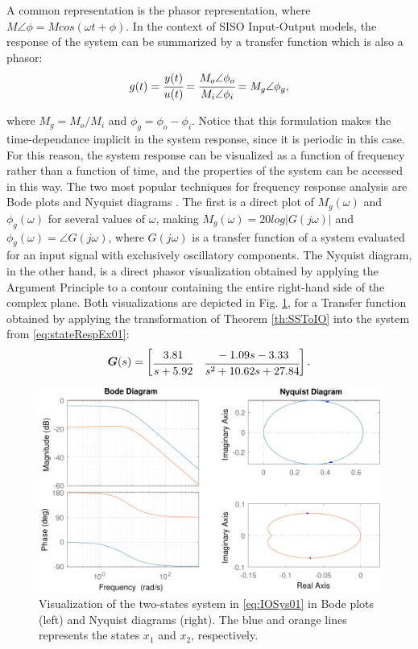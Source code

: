 \documentclass[a4paper,11pt]{book}
\numberwithin{figure}{chapter}
\numberwithin{equation}{chapter}
\numberwithin{table}{chapter}
\theoremstyle{definition}
\begin{document}
A common representation is the phasor representation, where $M \angle \phi = M cos(\omega t + \phi)$. In the context of SISO Input-Output models, the response of the system can be summarized by a transfer function which is also a phasor:
\begin{equation}
    g(t) = \cfrac{y(t)}{u(t)} = \cfrac{M_o \angle \phi_o}{M_i \angle \phi_i} = M_g \angle \phi_g
,\end{equation}

\noindent where $M_g = M_o / M_i$ and $\phi_g = \phi_o - \phi_i$. Notice that this formulation makes the time-dependance implicit in the system response, since it is periodic in this case. For this reason, the system response can be visualized as a function of frequency rather than a function of time, and the properties of the system can be accessed in this way. The two most popular techniques for frequency response analysis are Bode plots \cite{Bode:1945} and Nyquist diagrams \cite{Nyquist:1932}. The first is a direct plot of $M_g(\omega)$ and $\phi_g(\omega)$ for several values of $\omega$, making $M_g(\omega) = 20 log \left| G(j\omega) \right|$ and $\phi_g(\omega) = \angle G(j\omega)$, where $G(j\omega)$ is a transfer function of a system evaluated for an input signal with exclusively oscillatory components. The Nyquist diagram, in the other hand, is a direct phasor visualization obtained by applying the Argument Principle to a contour containing the entire right-hand side of the complex plane. Both visualizations are depicted in Fig. \ref{fig:freq02}, for a Transfer function obtained by applying the transformation of Theorem \ref{th:SSToIO} into the system from \eqref{eq:stateRespEx01}:
\begin{equation} \label{eq:IOSys01}
    \bm{G}(s) = \begin{bmatrix}
        \cfrac{3.81}{s + 5.92} & \cfrac{-1.09s - 3.33}{s^2 + 10.62s + 27.84}
    \end{bmatrix}
.\end{equation}

\begin{figure}[ht]
    \centering
    \includegraphics[width=\textwidth]{chapter2/freq02}
    \caption{Visualization of the two-states system in \eqref{eq:IOSys01} in Bode plots (left) and Nyquist diagrams (right). The blue and orange lines represents the states $x_1$ and $x_2$, respectively.}
    \label{fig:freq02}
\end{figure}
\end{document}
